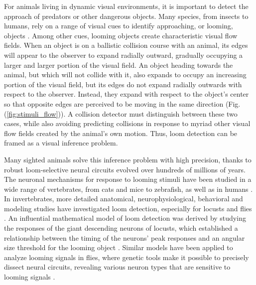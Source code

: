 \documentclass[pdftex,9pt,lineno]{elife}
\begin{document}
For animals living in dynamic visual environments, it is important to detect the approach of predators or other dangerous objects. Many species, from insects to humans, rely on a range of visual cues to identify approaching, or looming, objects \citep{regan1978looming,sun1998computation,gabbiani1999computation,card2008visually,munch2009approach,temizer2015visual}. Among other cues, looming objects create characteristic visual flow fields. When an object is on a ballistic collision course with an animal, its edges will appear to the observer to expand radially outward, gradually occupying a larger and larger portion of the visual field. An object heading towards the animal, but which will not collide with it, also expands to occupy an increasing portion of the visual field, but its edges do not expand radially outwards with respect to the observer. Instead, they expand with respect to the object's center so that opposite edges are perceived to be moving in the same direction (Fig. (\ref{fig:stimuli_flow})). A collision detector must distinguish between these two cases, while also avoiding predicting collisions in response to myriad other visual flow fields created by the animal's own motion. Thus, loom detection can be framed as a visual inference problem.

Many sighted animals solve this inference problem with high precision, thanks to robust loom-selective neural circuits evolved over hundreds of millions of years. The neuronal mechanisms for response to looming stimuli have been studied in a wide range of vertebrates, from cats and mice to zebrafish, as well as in humans
\citep{king1992use,hervais2015looming,ball1971infant,liu2011neuronal,salay2018midline,liu2011neuronal,shang2015parvalbumin,wu2005tectal,temizer2015visual,dunn2016neural,bhattacharyya2017visual}.
In invertebrates, more detailed anatomical, neurophysiological, behavioral and modeling studies have investigated loom detection, especially for locusts and flies \citep{oliva2014computation,sato2014role,santer2005gliding,rind1996neural,card2008visually,de2012loom,muijres2014flies,klapoetke2017ultra,von2017feature,ache2019neural}.
An influential mathematical model of loom detection was derived by studying the responses of the giant descending neurons of locusts, which established a relationship between the timing of the neurons' peak responses and an angular size threshold for the looming object \citep{gabbiani1999computation}. Similar models have been applied to analyze looming signals in  flies, where  genetic tools make it possible to precisely dissect neural circuits, revealing various neuron types that are sensitive to looming signals \citep{von2017feature,ache2019neural,morimoto2020spatial}.
\end{document}

